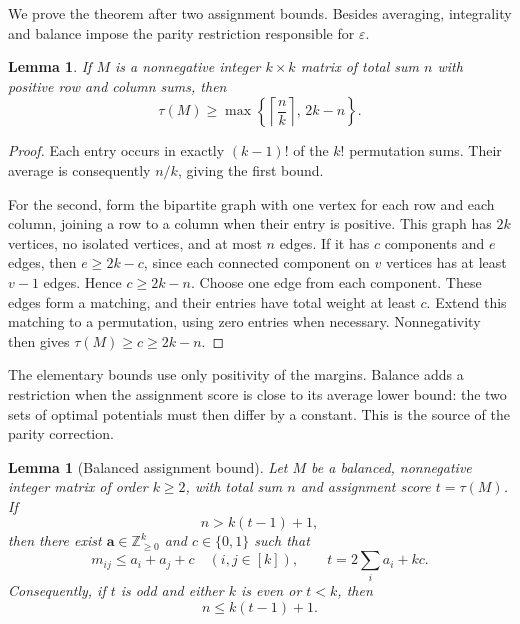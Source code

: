 \documentclass[10pt,a4paper]{amsart}
\numberwithin{equation}{section}
\newtheorem{lemma}[theorem]{Lemma}
\theoremstyle{definition}
\theoremstyle{remark}
\begin{document}
We prove the theorem after two assignment bounds. Besides averaging,
integrality and balance impose the parity restriction responsible for
$\varepsilon$.

\begin{lemma}
\label{ext:elementary-assignment}
If $M$ is a nonnegative integer $k\times k$ matrix of total sum $n$
with positive row and column sums, then
\[
 \tau(M)\ge
 \max\left\{\left\lceil\frac nk\right\rceil,\,2k-n\right\}.
\]
\end{lemma}

\begin{proof}
Each entry occurs in exactly $(k-1)!$ of the $k!$ permutation sums.
Their average is consequently $n/k$, giving the first bound.

For the second, form the bipartite graph with one vertex for each row
and each column, joining a row to a column when their entry is positive.
This graph has $2k$ vertices, no isolated vertices, and at most $n$
edges.  If it has $c$ components and $e$ edges, then
$e\ge2k-c$, since each connected component on $v$ vertices has at
least $v-1$ edges.  Hence $c\ge2k-n$.  Choose one edge from each
component.  These edges form a matching, and their entries have total
weight at least $c$.  Extend this matching to a permutation, using
zero entries when necessary.  Nonnegativity then gives
$\tau(M)\ge c\ge2k-n$.
\end{proof}

The elementary bounds use only positivity of the margins. Balance
adds a restriction when the assignment score is close to its average
lower bound: the two sets of optimal potentials must then differ by
a constant. This is the source of the parity correction.

\begin{lemma}[Balanced assignment bound]
\label{ext:odd-assignment}
Let $M$ be a balanced, nonnegative integer matrix of order $k\ge2$,
with total sum $n$ and assignment score $t=\tau(M)$. If
\[
 n>k(t-1)+1,
\]
then there exist $\mathbf a\in\mathbb Z_{\ge0}^{k}$ and
$c\in\{0,1\}$ such that
\begin{equation}\label{ext:additive-cover}
 m_{ij}\le a_i+a_j+c\quad(i,j\in[k]),
 \qquad t=2\sum_i a_i+kc.
\end{equation}
Consequently, if $t$ is odd and either $k$ is even or $t<k$, then
\[
 n\le k(t-1)+1.
\]
\end{lemma}
\end{document}
